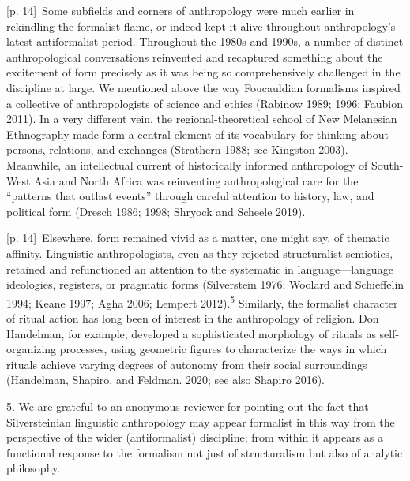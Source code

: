 \documentclass[10pt,a4paper]{article}
\begin{document}
{\scriptsize\color{gray} [p. 14]}\ Some subfields and corners of anthropology were much earlier in rekindling the formalist flame, or indeed kept it alive throughout anthropology’s latest antiformalist period. Throughout the 1980s and 1990s, a number of distinct anthropological conversations reinvented and recaptured something about the excitement of form precisely as it was being so comprehensively challenged in the discipline at large. We mentioned above the way Foucauldian formalisms inspired a collective of anthropologists of science and ethics (Rabinow 1989; 1996; Faubion 2011). In a very different vein, the regional-theoretical school of New Melanesian Ethnography made form a central element of its vocabulary for thinking about persons, relations, and exchanges (Strathern 1988; see Kingston 2003). Meanwhile, an intellectual current of historically informed anthropology of South-West Asia and North Africa was reinventing anthropological care for the “patterns that outlast events” through careful attention to history, law, and political form (Dresch 1986; 1998; Shryock and Scheele 2019).\par
{\scriptsize\color{gray} [p. 14]}\ Elsewhere, form remained vivid as a matter, one might say, of thematic affinity. Linguistic anthropologists, even as they rejected structuralist semiotics, retained and refunctioned an attention to the systematic in language—language ideologies, registers, or pragmatic forms (Silverstein 1976; Woolard and Schieffelin 1994; Keane 1997; Agha 2006; Lempert 2012).\textsuperscript{5} Similarly, the formalist character of ritual action has long been of interest in the anthropology of religion. Don Handelman, for example, developed a sophisticated morphology of rituals as self-organizing processes, using geometric figures to characterize the ways in which rituals achieve varying degrees of autonomy from their social surroundings (Handelman, Shapiro, and Feldman. 2020; see also Shapiro 2016).\par{\small 5. We are grateful to an anonymous reviewer for pointing out the fact that Silversteinian linguistic anthropology may appear formalist in this way from the perspective of the wider (antiformalist) discipline; from within it appears as a functional response to the formalism not just of structuralism but also of analytic philosophy.\par}
\end{document}
